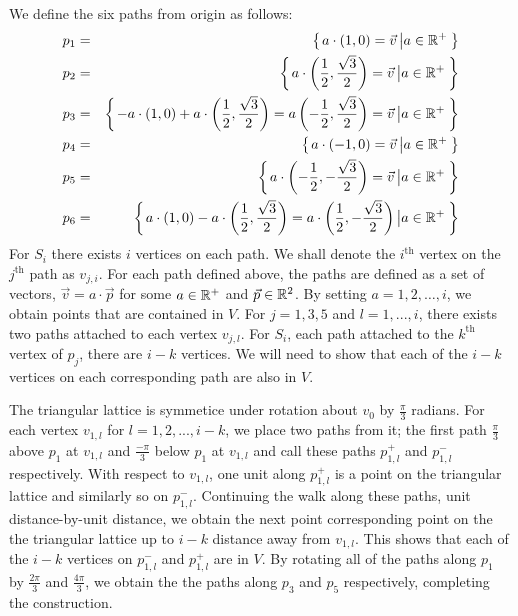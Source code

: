 We define the six paths from origin as follows:
\begin{eqnarray*}
p_1 &=& {\left\lbrace \left. a\cdot\left( 1,0 \right) = \vec{v} \left\vert a \in {\mathbb{R}}^+ \right.\right.\right\rbrace }\\
p_2 &=& {\left\lbrace \left. a\cdot\left( \frac{1}{2},\frac{\sqrt{3}}{2} \right) = \vec{v} \left\vert a \in {\mathbb{R}}^+ \right.\right.\right\rbrace }\\
p_3 &=& {\left\lbrace \left. -a\cdot \left( 1,0 \right) + a \cdot \left( \frac{1}{2},\frac{\sqrt{3}}{2} \right) = a\left( -\frac{1}{2},\frac{\sqrt{3}}{2} \right) = \vec{v} \left\vert a \in {\mathbb{R}}^+ \right.\right.\right\rbrace }\\
p_4 &=& {\left\lbrace \left. a \cdot \left( -1,0 \right) = \vec{v} \left\vert a \in {\mathbb{R}}^+ \right.\right.\right\rbrace }\\
p_5 &=& {\left\lbrace \left. a \cdot \left( -\frac{1}{2},-\frac{\sqrt{3}}{2} \right)  = \vec{v} \left\vert a \in {\mathbb{R}}^+ \right.\right.\right\rbrace }\\
p_6 &=& {\left\lbrace \left.  a\cdot \left( 1,0 \right) - a \cdot \left( \frac{1}{2},\frac{\sqrt{3}}{2} \right)= a \cdot \left( \frac{1}{2}, -\frac{\sqrt{3}}{2} \right) \left\vert a \in {\mathbb{R}}^+ \right.\right.\right\rbrace } 
\end{eqnarray*}
For $S_i$ there exists $i$ vertices on each path.  We shall denote the $i^\text{th}$ vertex on the $j^\text{th}$ path as $v_{j,i}$.  For each path defined above, the paths are defined as a set of vectors, $\vec{v} = a \cdot \vec{p}$  for some $a \in {\mathbb{R}}^+$ and $\vec{p} \in {\mathbb{R}}^2$.  By setting $a = 1,2,\dots, i$, we obtain points that are contained in $V$.  For $j = 1,3,5$ and $l = 1,..., i$, there exists two paths attached to each vertex $v_{j,l}$.  For $S_i$, each path attached to the $k^\text{th}$ vertex of $p_j$, there are $i-k$ vertices.  We will need to show that each of the $i-k$ vertices on each corresponding path are also in $V$.

The triangular lattice is symmetice under rotation about $v_0$ by $\frac{\pi}{3}$ radians.  For each vertex $v_{1,l}$ for $l=1,2,..., i-k$, we place two paths from it; the first path $\frac{\pi}{3}$ above $p_1$ at $v_{1,l}$ and $\frac{-\pi}{3}$ below $p_1$ at $v_{1,l}$ and call these paths $p_{1,l}^+$ and $p_{1,l}^-$ respectively.  With respect to $v_{1,l}$, one unit along $p_{1,l}^+$ is a point on the triangular lattice and similarly so on $p_{1,l}^-$.  Continuing the walk along these paths, unit distance-by-unit distance, we obtain the next point corresponding point on the the triangular lattice up to $i-k$ distance away from $v_{1,l}$.  This shows that each of the $i-k$ vertices on $p_{1,l}^-$ and $p_{1,l}^+$ are in $V$.  By rotating all of the paths along $p_1$ by $\frac{2\pi}{3}$ and $\frac{4\pi}{3}$, we obtain the the paths along $p_3$ and $p_5$ respectively, completing the construction.